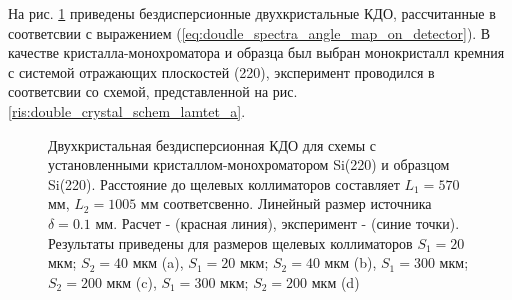 
\label{sec:non_disspers_KDO_section}
На рис. \ref{ris:non_disspers_kdo} приведены бездисперсионные двухкристальные КДО, рассчитанные в соответсвии
с выражением (\ref{eq:doudle_spectra_angle_map_on_detector}). В качестве кристалла-монохроматора
и образца был выбран монокристалл кремния с системой отражающих плоскостей (220), эксперимент проводился в
соответсвии со схемой, представленной на рис. \ref{ris:double_crystal_schem_lamtet_a}.

\begin{figure}[H]
  \centering
  \hfill
  \hfill
  \hfill
  \caption{Двухкристальная бездисперсионная КДО для схемы с установленными
   кристаллом-монохроматором Si(220) и образцом Si(220). Расстояние до щелевых коллиматоров
  составляет $L_1= 570 $мм, $L_2 = 1005$ мм соответсвенно.
  Линейный размер источника $\delta = 0.1$ мм. Расчет - (красная линия), эксперимент - (синие точки).
  Результаты приведены для размеров щелевых коллиматоров  $S_1 = 20 $ мкм; $ S_2 = 40$ мкм (a),
    $S_1 = 20 $ мкм; $ S_2 = 40$ мкм (b),
   $S_1 = 300 $ мкм; $ S_2 = 200$ мкм (c),
    $S_1 = 300 $ мкм; $ S_2 = 200$ мкм (d)}
  \label{ris:non_disspers_kdo}
\end{figure}

